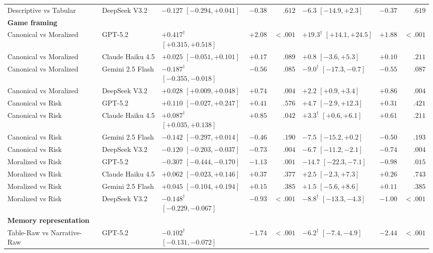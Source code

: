 \begin{table}[t]
\begin{tabular}{llp{3.1cm}rrp{3.1cm}rr}
Descriptive vs Tabular & DeepSeek V3.2 & $-0.127$ $[-0.294, +0.041]$ & $-0.38$ & $.612$ & $-6.3$ $[-14.9, +2.3]$ & $-0.37$ & $.619$ \\
\multicolumn{8}{l}{\textbf{Game framing}} \\
Canonical vs Moralized & GPT-5.2 & $+0.417^{\dagger}$ $[+0.315, +0.518]$ & $+2.08$ & $<.001$ & $+19.3^{\dagger}$ $[+14.1, +24.5]$ & $+1.88$ & $<.001$ \\
Canonical vs Moralized & Claude Haiku 4.5 & $+0.025$ $[-0.051, +0.101]$ & $+0.17$ & $.089$ & $+0.8$ $[-3.6, +5.3]$ & $+0.10$ & $.211$ \\
Canonical vs Moralized & Gemini 2.5 Flash & $-0.187^{\dagger}$ $[-0.355, -0.018]$ & $-0.56$ & $.085$ & $-9.0^{\dagger}$ $[-17.3, -0.7]$ & $-0.55$ & $.087$ \\
Canonical vs Moralized & DeepSeek V3.2 & $+0.028$ $[+0.009, +0.048]$ & $+0.74$ & $.004$ & $+2.2$ $[+0.9, +3.4]$ & $+0.86$ & $.004$ \\
Canonical vs Risk & GPT-5.2 & $+0.110$ $[-0.027, +0.247]$ & $+0.41$ & $.576$ & $+4.7$ $[-2.9, +12.3]$ & $+0.31$ & $.421$ \\
Canonical vs Risk & Claude Haiku 4.5 & $+0.087^{\dagger}$ $[+0.035, +0.138]$ & $+0.85$ & $.042$ & $+3.3^{\dagger}$ $[+0.6, +6.1]$ & $+0.61$ & $.211$ \\
Canonical vs Risk & Gemini 2.5 Flash & $-0.142$ $[-0.297, +0.014]$ & $-0.46$ & $.190$ & $-7.5$ $[-15.2, +0.2]$ & $-0.50$ & $.193$ \\
Canonical vs Risk & DeepSeek V3.2 & $-0.120$ $[-0.203, -0.037]$ & $-0.73$ & $.004$ & $-6.7$ $[-11.2, -2.1]$ & $-0.74$ & $.004$ \\
Moralized vs Risk & GPT-5.2 & $-0.307$ $[-0.444, -0.170]$ & $-1.13$ & $.001$ & $-14.7$ $[-22.3, -7.1]$ & $-0.98$ & $.015$ \\
Moralized vs Risk & Claude Haiku 4.5 & $+0.062$ $[-0.023, +0.146]$ & $+0.37$ & $.377$ & $+2.5$ $[-2.3, +7.3]$ & $+0.26$ & $.743$ \\
Moralized vs Risk & Gemini 2.5 Flash & $+0.045$ $[-0.104, +0.194]$ & $+0.15$ & $.385$ & $+1.5$ $[-5.6, +8.6]$ & $+0.11$ & $.385$ \\
Moralized vs Risk & DeepSeek V3.2 & $-0.148^{\dagger}$ $[-0.229, -0.067]$ & $-0.93$ & $<.001$ & $-8.8^{\dagger}$ $[-13.3, -4.3]$ & $-1.00$ & $<.001$ \\
\multicolumn{8}{l}{\textbf{Memory representation}} \\
Table-Raw vs Narrative-Raw & GPT-5.2 & $-0.102^{\dagger}$ $[-0.131, -0.072]$ & $-1.74$ & $<.001$ & $-6.2^{\dagger}$ $[-7.4, -4.9]$ & $-2.44$ & $<.001$ \\

\end{tabular}
\end{table}
